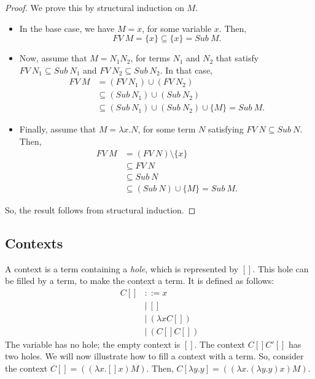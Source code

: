 \documentclass[a4paper, openany]{memoir}
\theoremstyle{definition}
\begin{document}
    \begin{proof}
        We prove this by structural induction on $M$.
        \begin{itemize}
            \item In the base case, we have $M = x$, for some variable $x$. Then,
            \[FV \ M = \{x\} \subseteq \{x\} = Sub \ M.\]

            \item Now, assume that $M = N_1 N_2$, for terms $N_1$ and $N_2$ that satisfy $FV \ N_1 \subseteq Sub \ N_1$ and $FV \ N_2 \subseteq Sub \ N_2$. In that case,
            \begin{align*}
                FV \ M &= (FV \ N_1) \cup (FV \ N_2) \\
                &\subseteq (Sub \ N_1) \cup (Sub \ N_2) \\
                &\subseteq (Sub \ N_1) \cup (Sub \ N_2) \cup \{M\} = Sub \ M.
            \end{align*}

            \item Finally, assume that $M = \lambda x. N$, for some term $N$ satisfying $FV \ N \subseteq Sub \ N$. Then,
            \begin{align*}
                FV \ M &= (FV \ N) \setminus \{x\} \\
                &\subseteq FV \ N \\
                &\subseteq Sub \ N \\
                &\subseteq (Sub \ N) \cup \{M\} = Sub \ M.
            \end{align*}
        \end{itemize}
        So, the result follows from structural induction.
    \end{proof}

    \subsection{Contexts}
    A context is a term containing a \emph{hole}, which is represented by $[]$. This hole can be filled by a term, to make the context a term. It is defined as follows:
    \begin{align*}
        C[] &::= x \\
        &| \ [] \\
        &| \ (\lambda x C[]) \\
        &| \ (C[] C[])
    \end{align*}
    The variable has no hole; the empty context is $[]$. The context $C[] C'[]$ has two holes. We will now illustrate how to fill a context with a term. So, consider the context $C[] = ((\lambda x. [] x) M)$. Then, $C[\lambda y.y] = ((\lambda x.(\lambda y.y) x) M)$.
\end{document}
